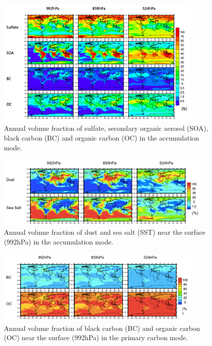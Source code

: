 \documentclass[12pt, fullpage]{uiucthesis2009_2}
\begin{document}
		\begin{figure}[h] 
			\begin{center}
				\includegraphics[width = 0.9\textwidth]{Figure29}
				\caption[Annual average of the volume fraction of sulfate, secondary organic aerosol (SOA), black carbon (BC) and organic carbon (OC) in the accumulation mode]{\label{fig_P29} Annual volume fraction of sulfate, secondary organic aerosol (SOA), black carbon (BC) and organic carbon (OC) in the accumulation mode.}
			\end{center}
		\end{figure}
			\begin{figure}[h] 
				\begin{center}
					\includegraphics[width = 0.95\textwidth]{Figure30}
					\caption[Annual volume fraction of dust and sea salt (SST) near the surface (992hPa) in the accumulation mode]{\label{fig_P30} Annual volume fraction of dust and sea salt (SST) near the surface (992hPa) in the accumulation mode.}
				\end{center}
			\end{figure}
				\begin{figure}[h] 
					\begin{center}
						\includegraphics[width = 0.9\textwidth]{Figure31}
						\caption[Annual volume fraction of black carbon (BC) and organic carbon (OC) near the surface (992hPa) in the primary carbon mode]{\label{fig_P31} Annual volume fraction of black carbon (BC) and organic carbon (OC) near the surface (992hPa) in the primary carbon mode.}
					\end{center}
				\end{figure}
\end{document}
